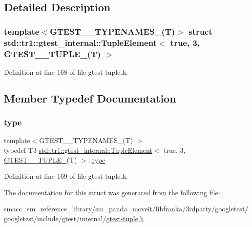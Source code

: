 \subsection{Detailed Description}
\subsubsection*{template$<$G\+T\+E\+S\+T\+\_\+\_\+\+T\+Y\+P\+E\+N\+A\+M\+E\+S\+\_\+(\+T)$>$\newline
struct std\+::tr1\+::gtest\+\_\+internal\+::\+Tuple\+Element$<$ true, 3, G\+T\+E\+S\+T\+\_\+\_\+\+T\+U\+P\+L\+E\+\_\+(\+T) $>$}



Definition at line 168 of file gtest-\/tuple.\+h.



\subsection{Member Typedef Documentation}
\mbox{\label{structstd_1_1tr1_1_1gtest__internal_1_1TupleElement_3_01true_00_013_00_01GTEST__10__TUPLE___07T_08_01_4_a0abc8519ff756a7736076063626a2718}} 
\subsubsection{\texorpdfstring{type}{type}}
{\footnotesize\ttfamily template$<$G\+T\+E\+S\+T\+\_\+\_\+\+T\+Y\+P\+E\+N\+A\+M\+E\+S\+\_\+(\+T) $>$ \\
typedef T3 \hyperlink{structstd_1_1tr1_1_1gtest__internal_1_1TupleElement}{std\+::tr1\+::gtest\+\_\+internal\+::\+Tuple\+Element}$<$ true, 3, \hyperlink{namespacestd_1_1tr1_aa636d3269bf1f368a7bc09ff158bc482}{G\+T\+E\+S\+T\+\_\+\_\+\+T\+U\+P\+L\+E\+\_\+}(T) $>$\+::\hyperlink{structstd_1_1tr1_1_1gtest__internal_1_1TupleElement_3_01true_00_013_00_01GTEST__10__TUPLE___07T_08_01_4_a0abc8519ff756a7736076063626a2718}{type}}



Definition at line 169 of file gtest-\/tuple.\+h.



The documentation for this struct was generated from the following file\+:\begin{DoxyCompactItemize}
\item 
smacc\+\_\+sm\+\_\+reference\+\_\+library/sm\+\_\+panda\+\_\+moveit/libfranka/3rdparty/googletest/googletest/include/gtest/internal/\hyperlink{gtest-tuple_8h}{gtest-\/tuple.\+h}\end{DoxyCompactItemize}
